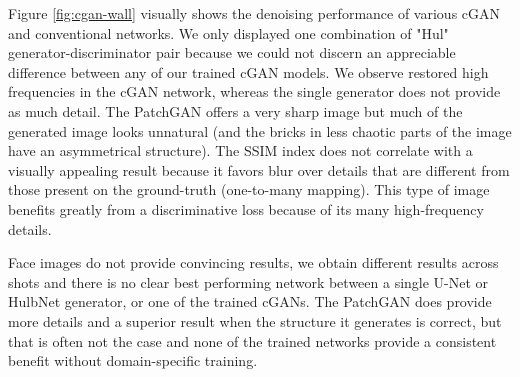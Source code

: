 Figure \ref{fig:cgan-wall} visually shows the denoising performance of various \ac{cGAN} and conventional networks. We only displayed one combination of "Hul" generator-discriminator pair because we could not discern an appreciable difference between any of our trained \ac{cGAN} models. We observe restored high frequencies in the \ac{cGAN} network, whereas the single generator does not provide as much detail. The PatchGAN offers a very sharp image but much of the generated image looks unnatural (and the bricks in less chaotic parts of the image have an asymmetrical structure). The SSIM index does not correlate with a visually appealing result because it favors blur over details that are different from those present on the ground-truth (one-to-many mapping). This type of image benefits greatly from a discriminative loss because of its many high-frequency details.

Face images do not provide convincing results, we obtain different results across shots and there is no clear best performing network between a single U-Net or HulbNet generator, or one of the trained \acp{cGAN}. The PatchGAN does provide more details and a superior result when the structure it generates is correct, but that is often not the case and none of the trained networks provide a consistent benefit without domain-specific training.







